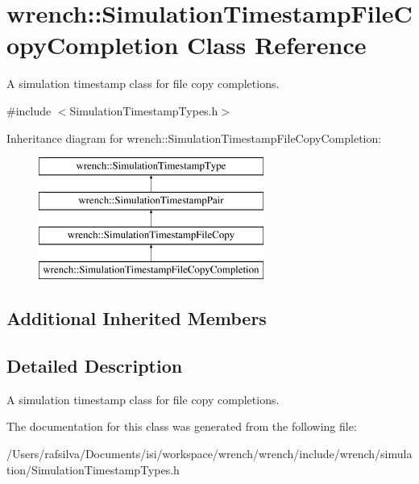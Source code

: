 \hypertarget{classwrench_1_1_simulation_timestamp_file_copy_completion}{}\section{wrench\+:\+:Simulation\+Timestamp\+File\+Copy\+Completion Class Reference}
\label{classwrench_1_1_simulation_timestamp_file_copy_completion}


A simulation timestamp class for file copy completions.  




{\ttfamily \#include $<$Simulation\+Timestamp\+Types.\+h$>$}

Inheritance diagram for wrench\+:\+:Simulation\+Timestamp\+File\+Copy\+Completion\+:\begin{figure}[H]
\begin{center}
\leavevmode
\includegraphics[height=4.000000cm]{classwrench_1_1_simulation_timestamp_file_copy_completion}
\end{center}
\end{figure}
\subsection*{Additional Inherited Members}


\subsection{Detailed Description}
A simulation timestamp class for file copy completions. 

The documentation for this class was generated from the following file\+:\begin{DoxyCompactItemize}
\item 
/\+Users/rafsilva/\+Documents/isi/workspace/wrench/wrench/include/wrench/simulation/Simulation\+Timestamp\+Types.\+h\end{DoxyCompactItemize}
